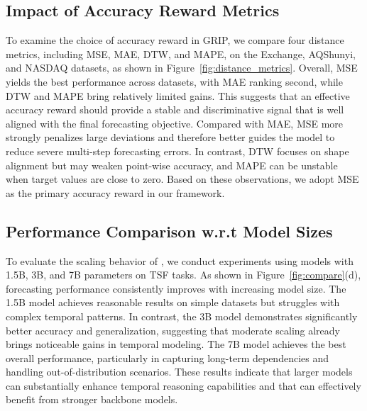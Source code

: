 \vspace{-0.04in}
\subsection{Impact of Accuracy Reward Metrics}
\label{more_reward}
To examine the choice of accuracy reward in GRIP, we compare four distance metrics, including MSE, MAE, DTW, and MAPE, on the Exchange, AQShunyi, and NASDAQ datasets, as shown in Figure~\ref{fig:distance_metrics}. Overall, MSE yields the best performance across datasets, with MAE ranking second, while DTW and MAPE bring relatively limited gains. This suggests that an effective accuracy reward should provide a stable and discriminative signal that is well aligned with the final forecasting objective. Compared with MAE, MSE more strongly penalizes large deviations and therefore better guides the model to reduce severe multi-step forecasting errors. In contrast, DTW focuses on shape alignment but may weaken point-wise accuracy, and MAPE can be unstable when target values are close to zero. Based on these observations, we adopt MSE as the primary accuracy reward in our framework.


\subsection{Performance Comparison w.r.t Model Sizes} 

To evaluate the scaling behavior of \Ours, we conduct experiments using models with 1.5B, 3B, and 7B parameters on TSF tasks. As shown in Figure~\ref{fig:compare}(d), forecasting performance consistently improves with increasing model size. The 1.5B model achieves reasonable results on simple datasets but struggles with complex temporal patterns. In contrast, the 3B model demonstrates significantly better accuracy and generalization, suggesting that moderate scaling already brings noticeable gains in temporal modeling. The 7B model achieves the best overall performance, particularly in capturing long-term dependencies and handling out-of-distribution scenarios. These results indicate that larger models can substantially enhance temporal reasoning capabilities and that \Ours can effectively benefit from stronger backbone models.




